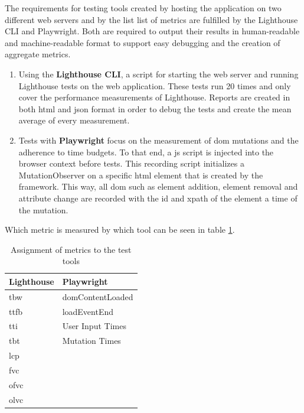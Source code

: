 \documentclass[a4paper, 12pt]{article}
\begin{document}
The requirements for testing tools created by hosting the application on two different web servers and by the list list of metrics are fulfilled by the Lighthouse CLI and Playwright.
Both are required to output their results in human-readable and machine-readable format to support easy debugging and the creation of aggregate metrics.

\begin{enumerate}
  \item Using the \textbf{Lighthouse CLI}, a script for starting the web server and running Lighthouse tests on the web application.
  These tests run 20 times and only cover the performance measurements of Lighthouse.
  Reports are created in both \acrshort{html} and \acrshort{json} format in order to debug the tests and create the mean average of every measurement.
  \item Tests with \textbf{Playwright} focus on the measurement of \acrshort{dom} mutations and the adherence to time budgets.
  To that end, a \acrshort{js} script is injected into the browser context before tests.
  This recording script initializes a MutationObserver on a specific \acrshort{html} element that is created by the framework.
  This way, all \acrshort{dom} such as element addition, element removal and attribute change are recorded with the id and xpath of the element a time of the mutation.
\end{enumerate}

Which metric is measured by which tool can be seen in table \ref{tab:metricassignment}.

\begin{table}[h]
  \begin{center}
    \begin{tabular}{|l|l|}
      \hline
      \textbf{Lighthouse} & \textbf{Playwright} \\ \hline
      \acrfull{tbw}       & domContentLoaded    \\ \hline
      \acrfull{ttfb}      & loadEventEnd        \\ \hline
      \acrfull{tti}       & User Input Times    \\ \hline
      \acrfull{tbt}       & Mutation Times      \\ \hline
      \acrfull{lcp}       &                     \\ \hline
      \acrfull{fvc}       &                     \\ \hline
      \acrfull{ofvc}      &                     \\ \hline
      \acrfull{olvc}      &                     \\ \hline
    \end{tabular}
  \end{center}
  \caption{Assignment of metrics to the test tools}
  \label{tab:metricassignment}
\end{table}
\end{document}
